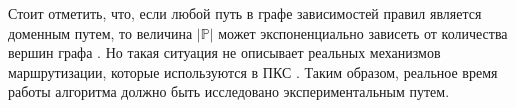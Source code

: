 \documentclass[../thesis.tex]{subfiles}
\begin{document}
Стоит отметить, что, если любой путь в графе зависимостей правил является доменным путем, то величина $|\mathbb{P}|$ может экспоненциально зависеть от количества вершин графа \cite{diestel2018graph}.
Но такая ситуация не описывает реальных механизмов маршрутизации, которые используются в ПКС \cite{kreutz2015software}.
Таким образом, реальное время работы алгоритма должно быть исследовано экспериментальным путем.

\end{document}

